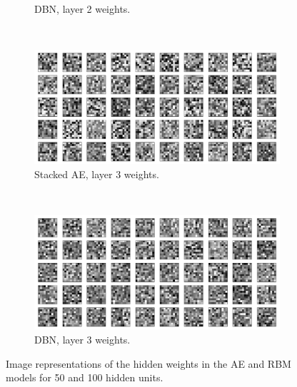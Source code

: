 \documentclass{article}
\begin{document}
\begin{figure}[!ht]
\begin{subfigure}[t]{0.47\textwidth}
    \caption{DBN, layer 2 weights.}
    \label{fig:w50rbm}
  \end{subfigure}
  \addtocounter{subfigure}{-2}
  ~
  \begin{subfigure}[t]{0.47\textwidth}
    \centering
    \includegraphics[width=\textwidth]{../plots/3_2_1/sae_3l.png}
    \caption{Stacked AE, layer 3 weights.}
    \label{fig:w100ae}
  \end{subfigure}
  \addtocounter{subfigure}{1}
  ~
  \begin{subfigure}[t]{0.47\textwidth}
    \centering
    \includegraphics[width=\textwidth]{../plots/3_2_1/dbn_3l.png}
    \caption{DBN, layer 3 weights.}
    \label{fig:w100rbm}
  \end{subfigure}
  \caption{
    Image representations of the hidden weights in the AE and RBM models
    for 50 and 100 hidden units.
  }
  \label{fig:hiddenweights}
\end{figure}
\end{document}
